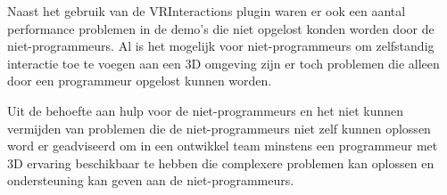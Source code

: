Naast het gebruik van de VRInteractions plugin waren er ook een aantal performance problemen in de demo's die niet opgelost konden worden door de niet-programmeurs. Al is het mogelijk voor niet-programmeurs om zelfstandig interactie toe te voegen aan een 3D omgeving zijn er toch problemen die alleen door een programmeur opgelost kunnen worden.

Uit de behoefte aan hulp voor de niet-programmeurs en het niet kunnen vermijden van problemen die de niet-programmeurs niet zelf kunnen oplossen word er geadviseerd om in een ontwikkel team minstens een programmeur met 3D ervaring beschikbaar te hebben die complexere problemen kan oplossen en ondersteuning kan geven aan de niet-programmeurs.